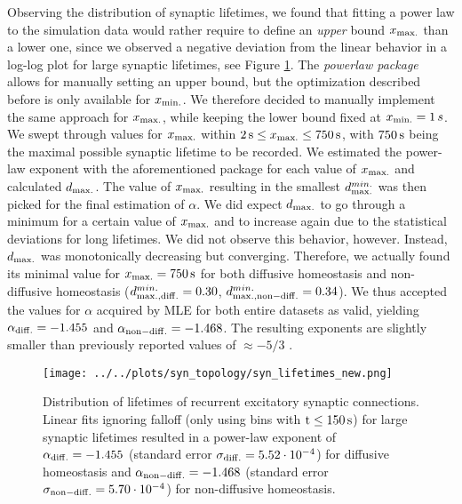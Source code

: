 \documentclass[10pt,a4paper]{article}
\begin{document}
Observing the distribution of synaptic lifetimes, we found that fitting a power law to the simulation data would rather require to define an \emph{upper} bound $x_{\rm max.}$ than a lower one, since we observed a negative deviation from the linear behavior in a log-log plot for large synaptic lifetimes, see Figure \ref{Syn_Lifetimes}. The \textit{powerlaw package} allows for manually setting an upper bound, but the optimization described before is only available for $x_{\rm min.}$. We therefore decided to manually implement the same approach for $x_{\rm max.}$, while keeping the lower bound fixed at $x_{\rm min.} = 1 \, s$.
We swept through values for $x_{\rm max.}$ within $\mathrm{2\,s} \leq x_{\rm max.} \leq \mathrm{750\,s}$, with $\rm 750 \, s$ being the maximal possible synaptic lifetime to be recorded. We estimated the power-law exponent with the aforementioned package for each value of $x_{\rm max.}$ and calculated $d_{\rm max.}$. The value of $x_{\rm max.}$ resulting in the smallest $d_{\rm max.}^{min.}$ was then picked for the final estimation of $\alpha$. We did expect $d_{\rm max.}$ to go through a minimum for a certain value of $x_{\rm max.}$ and to increase again due to the statistical deviations for long lifetimes. We did not observe this behavior, however. Instead, $d_{\rm max.}$ was monotonically decreasing but converging. Therefore, we actually found its minimal value for $x_{\rm max.} = \rm 750 \, s$ for both diffusive homeostasis and non-diffusive homeostasis ($d_{\rm max.,diff.}^{min.} = 0.30$, $d_{\rm max.,non-diff.}^{min.} = 0.34$). We thus accepted the values for $\alpha$ acquired by MLE for both entire datasets as valid, yielding $\mathrm{\alpha_{\rm diff.} = -1.455}$ and $\mathrm{\alpha_{\rm non-diff.} = -1.468}$. The resulting exponents are slightly smaller than previously reported values of $\mathrm{\approx - 5/3}$ \cite{SORN_Paper}. 
\begin{figure}
\texttt{[image: ../../plots/syn\_topology/syn\_lifetimes\_new.png]}
\caption[Distribution of lifetimes of recurrent excitatory synaptic connections]{Distribution of lifetimes of recurrent excitatory synaptic connections. Linear fits ignoring falloff (only using bins with $\rm t \leq 150 \, s$) for large synaptic lifetimes resulted in a power-law exponent of $\mathrm{\alpha_{\rm diff.} = -1.455}$ (standard error $\mathrm{\sigma_{\rm diff.} = 5.52 \cdot 10^{-4}}$) for diffusive homeostasis and $\mathrm{\alpha_{\rm non-diff.} = -1.468}$ (standard error $\mathrm{\sigma_{\rm non-diff.} = 5.70 \cdot 10^{-4}}$) for non-diffusive homeostasis.}
\label{Syn_Lifetimes}
\end{figure}
\end{document}
